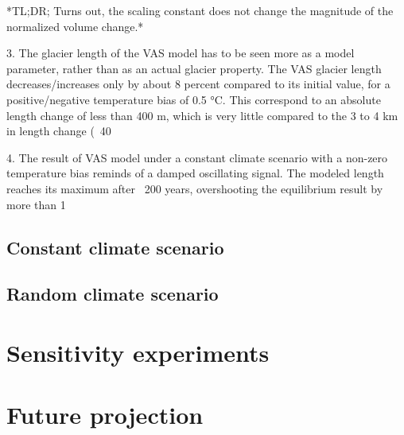          *TL;DR; Turns out, the scaling constant does not change the magnitude of the normalized volume change.* 

      3. The glacier length of the VAS model has to be seen more as a model parameter, rather than as an actual glacier property. The VAS glacier length decreases/increases only by about 8 percent compared to its initial value, for a positive/negative temperature bias of 0.5 °C. This correspond to an absolute length change of less than 400 m, which is very little compared to the 3 to 4 km in length change (~40%

      4. The result of VAS model under a constant climate scenario with a non-zero temperature bias reminds of a damped oscillating signal. The modeled length reaches its maximum after ~200 years, overshooting the equilibrium result by more than 1%
    

    \subsection{Constant climate scenario} %
    \label{sub:constant_climate_scenario_results}

    

    \subsection{Random climate scenario} %
    \label{sub:random_climate_scenario_results}
    


\section{Sensitivity experiments} %
\label{sec:sensitivity_experiments_results}


\section{Future projection} %
\label{sec:future_projection_results}

